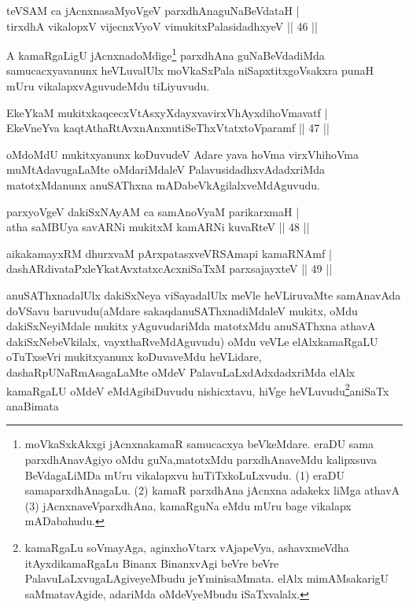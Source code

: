 \begin{shl}
teVSAM ca jAcnxnasaMyoVgeV parxdhAnaguNaBeVdataH |\\
tirxdhA vikalopxV vijecnxVyoV vimukitxPalasidadhxyeV \hfill || 46 ||
\end{shl}

\begin{artha}
A kamaRgaLigU jAcnxnadoMdige\footnote{moVkaSxkAkxgi jAcnxnakamaR samucacxya beVkeMdare. eraDU sama parxdhAnavAgiyo oMdu guNa,matotxMdu parxdhAnaveMdu kalipxsuva BeVdagaLiMDa mUru vikalapxvu huTiTxkoLuLxvudu. (1) eraDU samaparxdhAnagaLu. (2) kamaR parxdhAna jAcnxna adakekx liMga athavA (3) jAcnxnaveVparxdhAna, kamaRguNa eMdu mUru bage vikalapx mADabahudu.} parxdhAna guNaBeVdadiMda samucacxyavanunx heVLuvalUlx moVkaSxPala niSapxtitxgoVsakxra punaH mUru vikalapxvAguvudeMdu tiLiyuvudu.
\end{artha}


\begin{shl}
EkeYkaM mukitxkaqcecxVtAsxyXdayxvavirxVhAyxdihoVmavatf |\\
EkeVneYva kaqtAthaRtAvxnAnxnutiSeThxVtatxtoV\s paramf \hfill || 47 ||
\end{shl}

\begin{artha}
oMdoMdU mukitxyanunx koDuvudeV Adare yava hoVma virxVhihoVma muMtAdavugaLaMte oMdariMdaleV PalavusidadhxvAdadxriMda matotxMdanunx anuSAThxna mADabeVkAgilalxveMdAguvudu.
\end{artha}

\begin{shl}
parxyoVgeV dakiSxNAyAM ca samAnoV\s yaM parikarxmaH |\\
atha saMBUya savARNi mukitxM kamARNi kuvaRteV \hfill || 48 ||
\end{shl}

\begin{shl}
aikakamayxRM dhurxvaM pArxpatasxveVRSAmapi kamaRNAmf |\\
dashARdivataPxleYkatAvxtatxcAcxniSaTxM parxsajayxteV \hfill || 49 ||
\end{shl}

\begin{artha}
anuSAThxnadalUlx dakiSxNeya viSayadalUlx meVle heVLiruvaMte samAnavAda doVSavu baruvudu(aMdare sakaqdanuSAThxnadiMdaleV mukitx, oMdu dakiSxNeyiMdale mukitx yAguvudariMda matotxMdu anuSAThxna athavA dakiSxNebeVkilalx, vayxthaRveMdAguvudu) oMdu veVLe elAlxkamaRgaLU oTuTxseVri mukitxyanunx koDuvaveMdu heVLidare, dashaRpUNaRmAsagaLaMte oMdeV PalavuLaLxdAdxdadxriMda elAlx kamaRgaLU oMdeV eMdAgibiDuvudu nishicxtavu, hiVge heVLuvudu\footnote{kamaRgaLu soVmayAga, aginxhoVtarx vAjapeVya, ashavxmeVdha itAyxdikamaRgaLu Binanx BinanxvAgi beVre beVre PalavuLaLxvugaLAgiveyeMbudu jeYminisaMmata. elAlx mimAMsakarigU saMmatavAgide, adariMda oMdeVyeMbudu iSaTxvalalx.}aniSaTx anaBimata   
\end{artha}

